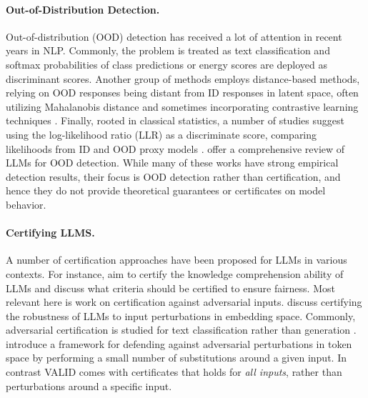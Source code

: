 \paragraph{Out-of-Distribution Detection. }
Out-of-distribution (OOD) detection has received a lot of attention in recent years in NLP. Commonly, the problem is treated as text classification and softmax probabilities of class predictions \citep{hendrycks_baseline_2017} or energy scores \citep{liu_energy-based_2020} are deployed as discriminant scores. Another group of methods employs distance-based methods, relying on OOD responses being distant from ID responses in latent space, often utilizing Mahalanobis distance and sometimes incorporating contrastive learning techniques \citep{uppaal_is_2023, podolskiy_revisiting_2021, zhou_contrastive_2021, khosla_supervised_2020, lin_flats_2023}. Finally, rooted in classical statistics, a number of studies suggest using the log-likelihood ratio (LLR) as a discriminate score, comparing likelihoods from ID and OOD proxy models \citep{gangal_likelihood_2020, zhang_your_2024}. \cite{xu_large_2024} offer a comprehensive review of LLMs for OOD detection. While many of these works have strong empirical detection results, their focus is OOD detection rather than certification, and hence they do not provide theoretical guarantees or certificates on model behavior.


\paragraph{Certifying LLMS.}
A number of certification approaches have been proposed for LLMs in various contexts. For instance, \citet{chaudhary_quantitative_2024-1} aim to certify the knowledge comprehension ability of LLMs and \citet{freiberger_fairness_2024} discuss what criteria should be certified to ensure fairness. Most relevant here is work on certification against adversarial inputs. \citet{casadio_nlp_2024} discuss certifying the robustness of LLMs to input perturbations in embedding space. Commonly, adversarial certification is studied for text classification rather than generation \citep{la_malfa_robustness_2023}. \citet{kumar_certifying_2024} introduce a framework for defending against adversarial perturbations in token space by performing a small number of substitutions around a given input. In contrast VALID comes with certificates that holds for \emph{all inputs}, rather than perturbations around a specific input.

\vspace{-2pt}